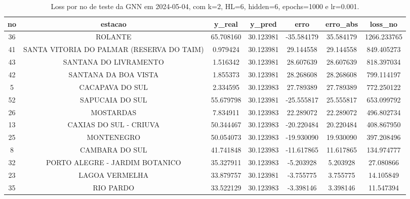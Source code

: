 \begin{table}[h]
\centering
\caption{Loss por no de teste da GNN em 2024-05-04, com k=2, HL=6, hidden=6, epochs=1000 e lr=0.001.}
\label{tab:gnn_loss_k2_hl6_h6_e1000_d20240504}
\begin{tabular}{ccccccc}
\toprule
no & estacao & y\_real & y\_pred & erro & erro\_abs & loss\_no \\
\midrule
36 & ROLANTE & 65.708160 & 30.123981 & -35.584179 & 35.584179 & 1266.233765 \\
41 & SANTA VITORIA DO PALMAR (RESERVA DO TAIM) & 0.979424 & 30.123981 & 29.144558 & 29.144558 & 849.405273 \\
43 & SANTANA DO LIVRAMENTO & 1.516342 & 30.123981 & 28.607639 & 28.607639 & 818.397034 \\
42 & SANTANA DA BOA VISTA & 1.855373 & 30.123981 & 28.268608 & 28.268608 & 799.114197 \\
5 & CACAPAVA DO SUL & 2.334595 & 30.123983 & 27.789389 & 27.789389 & 772.250122 \\
52 & SAPUCAIA DO SUL & 55.679798 & 30.123981 & -25.555817 & 25.555817 & 653.099792 \\
26 & MOSTARDAS & 7.834911 & 30.123983 & 22.289072 & 22.289072 & 496.802734 \\
13 & CAXIAS DO SUL - CRIUVA & 50.344467 & 30.123983 & -20.220484 & 20.220484 & 408.867950 \\
25 & MONTENEGRO & 50.054073 & 30.123983 & -19.930090 & 19.930090 & 397.208496 \\
8 & CAMBARA DO SUL & 41.741848 & 30.123983 & -11.617865 & 11.617865 & 134.974777 \\
32 & PORTO ALEGRE - JARDIM BOTANICO & 35.327911 & 30.123983 & -5.203928 & 5.203928 & 27.080866 \\
23 & LAGOA VERMELHA & 33.879757 & 30.123981 & -3.755775 & 3.755775 & 14.105849 \\
35 & RIO PARDO & 33.522129 & 30.123983 & -3.398146 & 3.398146 & 11.547394 \\
\bottomrule
\end{tabular}
\end{table}
